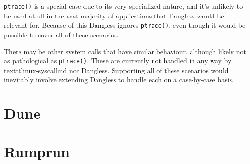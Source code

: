 \lstinline!ptrace()! is a special case due to its very specialized nature, and it's unlikely to be used at all in the vast majority of applications that Dangless would be relevant for. Because of this Dangless ignores \lstinline!ptrace()!, even though it would be possible to cover all of these scenarios.

There may be other system calls that have similar behaviour, although likely not as pathological as \lstinline!ptrace()!. These are currently not handled in any way by texttt{linux-syscallmd} nor Dangless. Supporting all of these scenarios would inevitably involve extending Dangless to handle each on a case-by-case basis.

\section{Dune}



\section{Rumprun}

